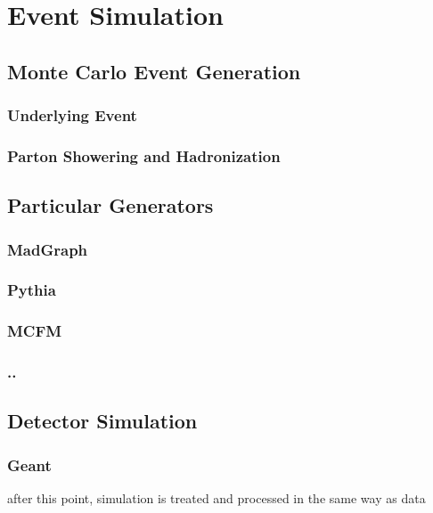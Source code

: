 
\chapter{Event Simulation}\label{sec:simulation}

\section{Monte Carlo Event Generation}

 \subsection{Underlying Event}

 \subsection{Parton Showering and Hadronization}

\section{Particular Generators}

 \subsection{MadGraph}
 \subsection{Pythia}
 \subsection{MCFM}
 \subsection{..}
 

\section{Detector Simulation}

 \subsection{Geant}
  after this point, simulation is treated and processed in the same way as data


